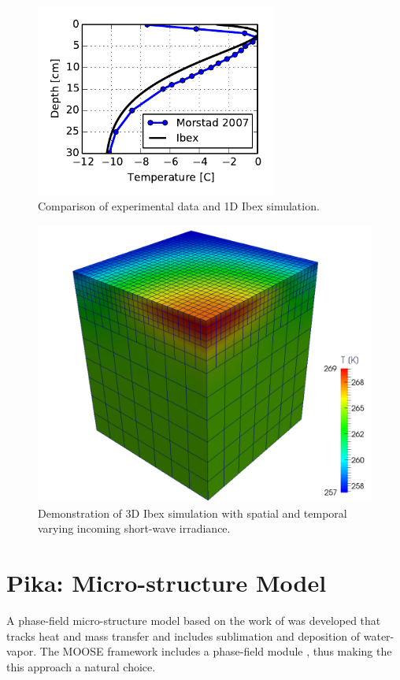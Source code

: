 \begin{figure}[t]
  \includegraphics[width=3.125in]{figures/ibex.pdf}
  \caption{Comparison of experimental data and 1D Ibex simulation.}
  \label{fig:ibex_1d}
\end{figure}

\begin{figure}[!ht]
  \includegraphics[width=\linewidth]{figures/ibex3d.pdf}
  \caption{Demonstration of 3D Ibex simulation with spatial and temporal varying incoming short-wave irradiance.}
  \label{fig:ibex_3d}
\end{figure}



\section{Pika: Micro-structure Model}\label{sec:pika}
A phase-field micro-structure model based on the work of \citet{kaempfer2009phase} was developed that tracks heat and mass transfer and includes sublimation and deposition of water-vapor. The MOOSE framework includes a phase-field module \citep{tonks2012object}, thus making the this approach a natural choice.

